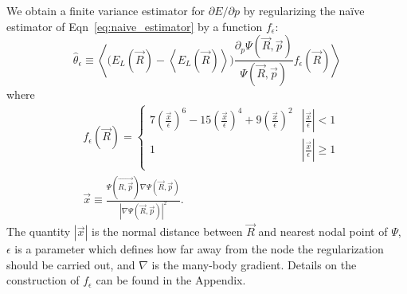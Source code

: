 \documentclass[twocolumn]{revtex4-1}
\begin{document}
We obtain a finite variance estimator for $\partial E/\partial p$ by regularizing the na\"ive estimator of Eqn~\ref{eq:naive_estimator} by a function $f_\epsilon$:
\begin{equation}
\hat{\theta}_\epsilon \equiv \left\langle \Big(E_L(\vec{R})  - \left\langle E_L(\vec{R}) \right \rangle\Big)\frac{\partial_p \Psi(\vec{R}, \vec{p})}{\Psi(\vec{R}, \vec{p})} f_\epsilon(\vec{R}) \right\rangle
\label{eq:regularized_estimator}
\end{equation}
where 
\begin{equation}
\begin{split}
&f_\epsilon(\vec{R}) = \begin{cases} 
     7(\frac{\vec{x}}{\epsilon})^6 - 15(\frac{\vec{x}}{\epsilon})^4 + 9(\frac{\vec{x}}{\epsilon})^2 & |\frac{\vec{x}}{\epsilon}| < 1 \\
      1 & |\frac{\vec{x}}{\epsilon}| \ge 1 \\
   \end{cases}\\ 
 &\vec{x} \equiv \frac{\Psi(\vec{R, \vec{p}}) \nabla \Psi(\vec{R}, \vec{p})}{|\nabla \Psi(\vec{R}, \vec{p})|^2}.
\end{split}
\label{eq:regularizing_function}
\end{equation} 
The quantity $|\vec{x}|$ is the normal distance between $\vec{R}$ and nearest nodal point of $\Psi$, $\epsilon$ is a parameter which defines how far away from the node the regularization should be carried out, and $\nabla$ is the many-body gradient.
Details on the construction of $f_\epsilon$ can be found in the Appendix.
\end{document}
